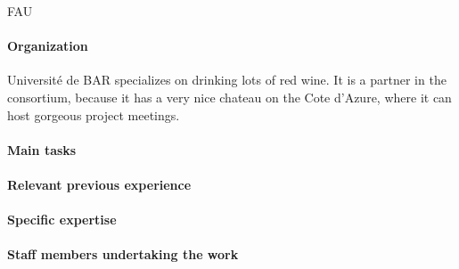 \begin{sitedescription}{FAU}

\paragraph{Organization}
  Universit\'e de BAR specializes on drinking lots of red wine. It is a partner in the
  consortium, because it has a very nice chateau on the Cote d'Azure, where it can host
  gorgeous project meetings.

\paragraph{Main tasks}
\paragraph{Relevant previous experience}
\paragraph{Specific expertise}
\paragraph{Staff members undertaking the work}

\end{sitedescription}

